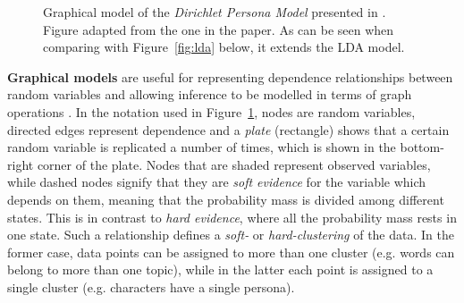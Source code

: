 \documentclass[bsc,frontabs,singlespacing,parskip, twoside]{infthesis}
\begin{document}
\begin{figure}[ht!]
\centering
{}
\caption{Graphical model of the \textit{Dirichlet Persona Model} presented in \cite{Bamman2013}. Figure adapted from the one in the paper. As can be seen when comparing with Figure~\ref{fig:lda} below, it extends the LDA model.}
\label{fig:dirichlet_persona}
\end{figure}

\textbf{Graphical models} are useful for representing dependence relationships between random variables and allowing inference to be modelled in terms of graph operations \cite{barber2012bayesian}. In the notation used in Figure~\ref{fig:dirichlet_persona}, nodes are random variables, directed edges represent dependence and a \textit{plate} (rectangle) shows that a certain random variable is replicated a number of times, which is shown in the bottom-right corner of the plate. Nodes that are shaded represent observed variables, while dashed nodes signify that they are \textit{soft evidence} for the variable which depends on them, meaning that the probability mass is divided among different states. This is in contrast to \textit{hard evidence}, where all the probability mass rests in one state. Such a relationship defines a \textit{soft-} or \textit{hard-clustering} of the data. In the former case, data points can be assigned to more than one cluster (e.g. words can belong to more than one topic), while in the latter each point is assigned to a single cluster (e.g. characters have a single persona).
\end{document}
